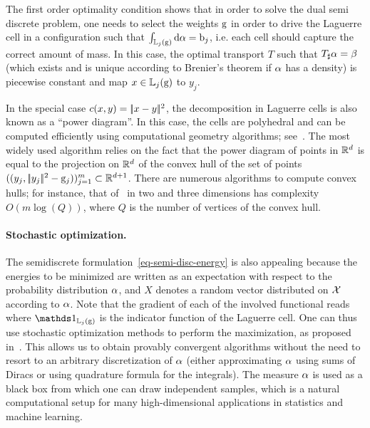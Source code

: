 The first order optimality condition shows that in order to solve the dual semi discrete problem, one needs to select the weights $\mathrm{g}$ in order to drive the Laguerre cell in a configuration such that $\int_{\mathbb{L}_{j}(\mathrm{g})} \mathrm{d}\alpha = \mathrm{b}_j$, i.e. each cell should capture the correct amount of mass. In this case, the optimal transport $T$ such that $T_\sharp \alpha=\beta$ (which exists and is unique according to Brenier's theorem if $\alpha$ has a density) is piecewise constant and map $x \in \mathbb{L}_{j}(\mathrm{g})$ to $y_j$.  

In the special case $c(x,y)=|\!| x-y |\!|^2$, the decomposition in Laguerre cells is also known as a ``power diagram''.  
%
In this case, the cells are polyhedral and can be computed efficiently using computational geometry algorithms; see~\cite{aurenhammer1987power}. 
%
The most widely used algorithm relies on the fact that the power diagram of points in $\mathbb{R}^d$ is equal to the projection on $\mathbb{R}^d$ of the convex hull of the set of points $( (y_j,|\!| y_j |\!|^2 - \mathrm{g}_j) )_{j=1}^m \subset \mathbb{R}^{d+1}$. There are numerous algorithms to compute convex hulls; for instance, that of~\cite{chan1996optimal} in two and three dimensions has complexity $O(m\log(Q))$, where $Q$ is the number of vertices of the convex hull.


\paragraph{Stochastic optimization.}

The semidiscrete formulation~\eqref{eq-semi-disc-energy} is also appealing because the energies to be minimized are written as an expectation with respect to the probability distribution $\alpha$,
and $X$ denotes a random vector distributed on $\mathcal{X}$ according to $\alpha$.
%
Note that the gradient of each of the involved functional reads
where $\ones_{\Laguerre_{j}(\gD)}$ is the indicator function of the Laguerre cell. 
%
One can thus use stochastic optimization methods to perform the maximization, as proposed in~\cite{genevay2016stochastic}.
%
This allows us to obtain provably convergent algorithms without the need to resort to an arbitrary discretization of $\alpha$ (either approximating $\alpha$ using sums of Diracs or using quadrature formula for the integrals).
%
The measure $\alpha$ is used as a black box from which one can draw independent samples, which is a natural computational setup for many high-dimensional applications in statistics and machine learning. 

